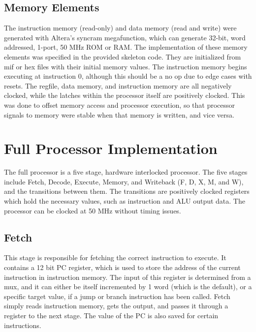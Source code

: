\documentclass[letterpaper]{article} %
\begin{document}
\subsection*{Memory Elements}
The instruction memory (read-only) and data memory (read and write) were generated with Altera's syncram megafunction, which can generate 32-bit, word addressed, 1-port, 50 MHz ROM or RAM. The implementation of these memory elements was specified in the provided skeleton code. They are initialized from mif or hex files with their initial memory values. The instruction memory begins executing at instruction 0, although this should be a no op due to edge cases with resets. The regfile, data memory, and instruction memory are all negatively clocked, while the latches within the processor itself are positively clocked. This was done to offset memory access and processor execution, so that processor signals to memory were stable when that memory is written, and vice versa.

\section*{Full Processor Implementation}
The full processor is a five stage, hardware interlocked processor. The five stages include Fetch, Decode, Execute, Memory, and Writeback (F, D, X, M, and W), and the transitions between them. The transitions are positively clocked registers which hold the necessary values, such as instruction and ALU output data. The processor can be clocked at 50 MHz without timing issues.\\

\subsection*{Fetch}
This stage is responsible for fetching the correct instruction to execute. It contains a 12 bit PC register, which is used to store the address of the current instruction in instruction memory. The input of this register is determined from a mux, and it can either be itself incremented by 1 word (which is the default), or a specific target value, if a jump or branch instruction has been called. Fetch simply reads instruction memory, gets the output, and passes it through a register to the next stage. The value of the PC is also saved for certain instructions. \\
\end{document}
